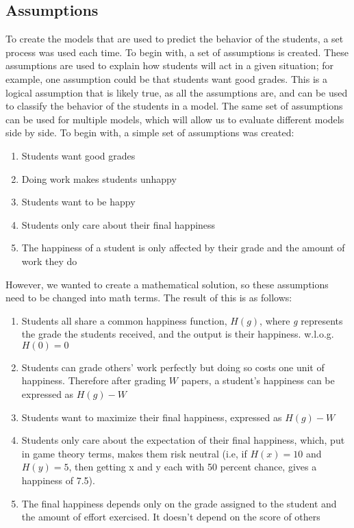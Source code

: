 \documentclass[12pt, Arial]{article}
\begin{document}
\subsection{Assumptions}
To create the models that are used to predict the behavior of the students, a set process was used each time. To begin with, a set of assumptions is created. These assumptions are used to explain how students will act in a given situation; for example, one assumption could be that students want good grades. This is a logical assumption that is likely true, as all the assumptions are, and can be used to classify the behavior of the students in a model. The same set of assumptions can be used for multiple models, which will allow us to evaluate different models side by side. To begin with, a simple set of assumptions was created:
\begin{enumerate}
	\item Students want good grades
 	\item Doing work makes students unhappy
  	\item Students want to be happy
 	\item Students only care about their final happiness
  	\item The happiness of a student is only affected by their grade and the amount of work they do
\end{enumerate}
However, we wanted to create a mathematical solution, so these assumptions need to be changed into math terms. The result of this is as follows:
\begin{enumerate}
  \item Students all share a common happiness function, $H(g)$, where \emph{g} represents the grade the students received, and the output is their happiness. w.l.o.g. $H(0)=0$
  \item Students can grade others' work perfectly but doing so costs one unit of happiness. Therefore after grading $W$ papers, a student's happiness can be expressed as $H(g)-W$
  \item Students want to maximize their final happiness, expressed as $H(g)-W$
  \item Students only care about the expectation of their final happiness, which, put in game theory terms, makes them risk neutral (i.e, if $H(x)=10$ and $H(y)=5$, then getting x and y each with 50 percent chance, gives a happiness of 7.5).
  \item The final happiness depends only on the grade assigned to the student and the amount of effort exercised. It doesn't depend on the score of others
\end{enumerate}
\end{document}

